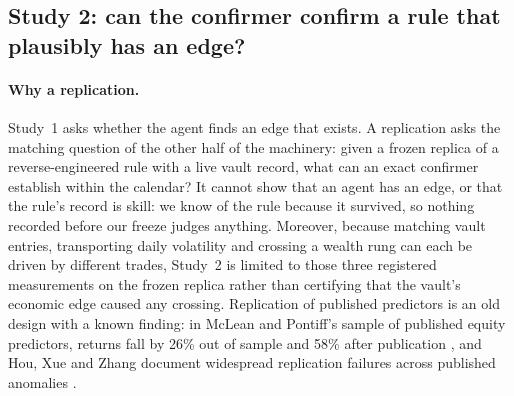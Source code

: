 \documentclass[11pt]{article}
\begin{document}
\subsection{Study 2: can the confirmer confirm a rule that plausibly has an edge?}\label{sec:study2}

\paragraph{Why a replication.} Study~1 asks whether the agent finds an edge that exists. A replication asks the matching question of the other half of the machinery: given a frozen replica of a reverse-engineered rule with a live vault record, what can an exact confirmer establish within the calendar? It cannot show that an agent has an edge, or that the rule's record is skill: we know of the rule because it survived, so nothing recorded before our freeze judges anything. Moreover, because matching vault entries, transporting daily volatility and crossing a wealth rung can each be driven by different trades, Study~2 is limited to those three registered measurements on the frozen replica rather than certifying that the vault's economic edge caused any crossing. Replication of published predictors is an old design with a known finding: in McLean and Pontiff's sample of published equity predictors, returns fall by 26\% out of sample and 58\% after publication \cite{mclean2016}, and Hou, Xue and Zhang document widespread replication failures across published anomalies \cite{hou2020}.
\end{document}
